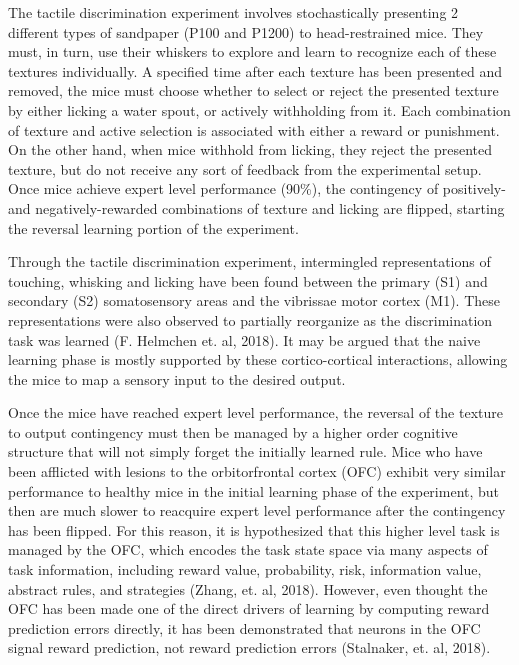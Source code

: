 \documentclass[]{article}
\begin{document}
The tactile discrimination experiment involves stochastically presenting 2 different types of sandpaper (P100 and P1200) to head-restrained mice.  They must, in turn, use their whiskers to explore and learn to recognize each of these textures individually.  A specified time after each texture has been presented and removed, the mice must choose whether to select or reject the presented texture by either licking a water spout, or actively withholding from it.  Each combination of texture and active selection is associated with either a reward or punishment.  On the other hand, when mice withhold from licking, they reject the presented texture, but do not receive any sort of feedback from the experimental setup.  Once mice achieve expert level performance (90\%), the contingency of positively- and negatively-rewarded combinations of texture and licking are flipped, starting the reversal learning portion of the experiment.

Through the tactile discrimination experiment, intermingled representations of touching, whisking and licking have been found between the primary (S1) and secondary (S2) somatosensory areas and the vibrissae motor cortex (M1).  These representations were also observed to partially reorganize as the discrimination task was learned (F. Helmchen et. al, 2018).  It may be argued that the naive learning phase is mostly supported by these cortico-cortical interactions, allowing the mice to map a sensory input to the desired output.

Once the mice have reached expert level performance, the reversal of the texture to output contingency must then be managed by a higher order cognitive structure that will not simply forget the initially learned rule.  Mice who have been afflicted with lesions to the orbitorfrontal cortex (OFC) exhibit very similar performance to healthy mice in the initial learning phase of the experiment, but then are much slower to reacquire expert level performance after the contingency has been flipped.  For this reason, it is hypothesized that this higher level task is managed by the OFC, which encodes the task state space via many aspects of task information, including reward value, probability, risk, information value, abstract rules, and strategies (Zhang, et. al, 2018).  However, even thought the OFC has been made one of the direct drivers of learning by computing reward prediction errors directly, it has been demonstrated that neurons in the OFC signal reward prediction, not reward prediction errors (Stalnaker, et. al, 2018).
\end{document}
